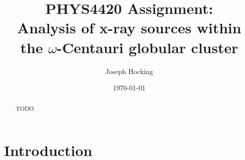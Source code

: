 \documentclass[aps,
                pra,  
                a4paper, 
                amsmath, 
                amssymb, 
                preprint,
                tightenlines,  
                amsfonts,
                nofootinbib,
            ]{revtex4-2}
\begin{document}
\title{PHYS4420 Assignment:\\Analysis of x-ray sources within the $\omega$-Centauri globular cluster}

\author{Joseph Hocking}
\noaffiliation

\date{\today}

\begin{abstract}
    TODO
\end{abstract}

\maketitle

\section{Introduction}
\end{document}
